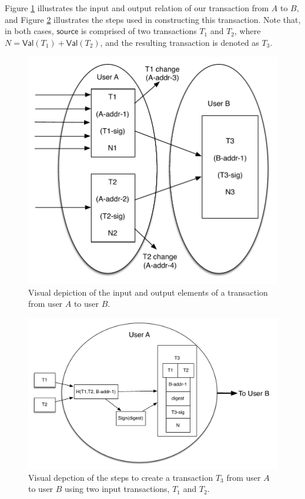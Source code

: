 Figure \ref{fig:transaction-io} illustrates the input and output relation of our transaction from $A$ to $B$, and Figure \ref{fig:transaction-create} illustrates the steps used in constructing this transaction. Note that, in both cases, $\mathsf{source}$ is comprised of two transactions $T_1$ and $T_2$, where $N = \mathsf{Val}(T_1) + \mathsf{Val}(T_2)$, and the resulting transaction is denoted as $T_3$.

\begin{center}
\begin{figure}
\includegraphics[scale=0.5]{./images/transaction_io.pdf}
\caption{Visual depiction of the input and output elements of a transaction from user $A$ to user $B$.}
\label{fig:transaction-io}
\end{figure}
\end{center}

\begin{center}
\begin{figure}
\includegraphics[scale=0.4]{./images/transaction_create.pdf}
\caption{Visual depction of the steps to create a transaction $T_3$ from user $A$ to user $B$ using two input transactions, $T_1$ and $T_2$.}
\label{fig:transaction-create}
\end{figure}
\end{center}

